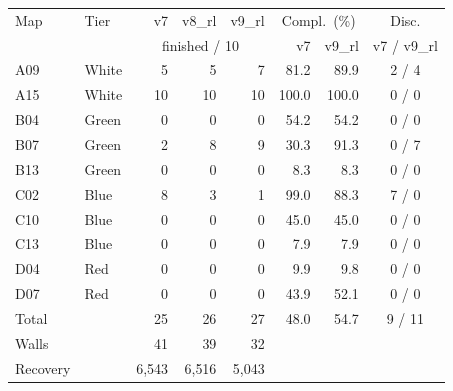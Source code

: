 \begin{tabular}{@{}llrrrrrc@{}}
\toprule
Map & Tier & v7 & v8\_rl & v9\_rl & \multicolumn{2}{c}{Compl.\ (\%)} & Disc. \\
 & & \multicolumn{3}{c}{finished / 10} & v7 & v9\_rl & v7 / v9\_rl \\
\midrule
A09 & White & 5 & 5 & 7 & 81.2 & 89.9 & 2 / 4 \\
A15 & White & 10 & 10 & 10 & 100.0 & 100.0 & 0 / 0 \\
B04 & Green & 0 & 0 & 0 & 54.2 & 54.2 & 0 / 0 \\
B07 & Green & 2 & 8 & 9 & 30.3 & 91.3 & 0 / 7 \\
B13 & Green & 0 & 0 & 0 & 8.3 & 8.3 & 0 / 0 \\
C02 & Blue & 8 & 3 & 1 & 99.0 & 88.3 & 7 / 0 \\
C10 & Blue & 0 & 0 & 0 & 45.0 & 45.0 & 0 / 0 \\
C13 & Blue & 0 & 0 & 0 & 7.9 & 7.9 & 0 / 0 \\
D04 & Red & 0 & 0 & 0 & 9.9 & 9.8 & 0 / 0 \\
D07 & Red & 0 & 0 & 0 & 43.9 & 52.1 & 0 / 0 \\
\midrule
Total & & 25 & 26 & 27 & 48.0 & 54.7 & 9 / 11 \\
Walls & & 41 & 39 & 32 & & & \\
Recovery & & 6{,}543 & 6{,}516 & 5{,}043 & & & \\
\bottomrule
\end{tabular}

